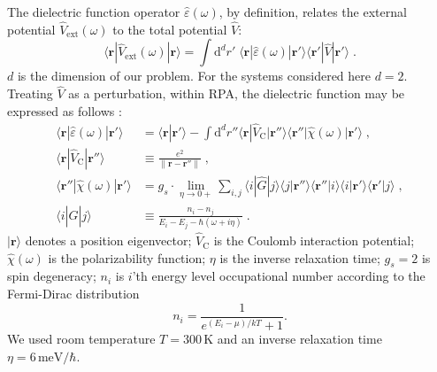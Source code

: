 The dielectric function operator $\hat\varepsilon(\omega)$, by definition, relates the external potential $\hat V_\text{ext}(\omega)$ to the total potential $\hat V$:
\begin{equation} \label{eq:dielectric_function_def}
    \langle\mathbf{r}| \hat V_\text{ext}(\omega) |\mathbf{r}\rangle
        = \int\!\! \text{d}^d r' \; \langle\mathbf{r}| \hat\varepsilon(\omega)
            |\mathbf{r'}\rangle \langle\mathbf{r'}| \hat V |\mathbf{r'}\rangle
    \;.
\end{equation}
$d$ is the dimension of our problem. For the systems considered here $d = 2$. Treating $\hat V$ as a perturbation, within RPA, the dielectric function may be expressed as follows \cite{Vonsov2012QuantumSolidS}:
\begin{equation} \label{eq:diel_func}
\begin{aligned}
    \langle\mathbf{r}| \hat\varepsilon(\omega) |\mathbf{r'}\rangle
        &= \langle\mathbf{r}|\mathbf{r'}\rangle
        \!-\!\!\!
        \int\!\! \text{d}^d r'' \langle\mathbf{r}| \hat V_\text{C}
            |\mathbf{r''}\rangle \langle\mathbf{r''}| \hat\chi(\omega)
            |\mathbf{r'}\rangle \;, \\
    \langle\mathbf{r}| \hat V_\text{C} |\mathbf{r''}\rangle
        &\equiv \frac{e^2}{\|\mathbf{r} - \mathbf{r''}\|} \;, \\
    \langle\mathbf{r''}| \hat\chi(\omega) |\mathbf{r'}\rangle
    &= g_s \cdot\! \lim_{\eta \to 0+} \sum_{i,j}
            \langle i| \hat G |j\rangle
            \langle j|\mathbf{r''}\rangle \langle\mathbf{r''} |i\rangle
            \langle i|\mathbf{r'}\rangle \langle\mathbf{r'} |j\rangle \;, \\
    \langle i| \hat G |j\rangle
        &\equiv \frac{n_i - n_j}{E_i - E_j - \hbar(\omega + i\eta)} \;.
\end{aligned}
\end{equation}
$|\mathbf{r}\rangle$ denotes a position eigenvector; $\hat V_\text{C}$ is the Coulomb interaction potential; $\hat\chi(\omega)$ is the polarizability function; $\eta$ is the inverse relaxation time; $g_s = 2$ is spin degeneracy; $n_i$ is $i$'th energy level occupational number according to the Fermi-Dirac distribution
\begin{equation} \label{eq:FD_dist}
    n_i = \frac{1}{e^{(E_i - \mu)/kT} + 1}.
\end{equation}
We used room temperature $T=300\,\text{K}$ and an inverse relaxation time $\eta = 6\,\text{meV/}\hbar$.

